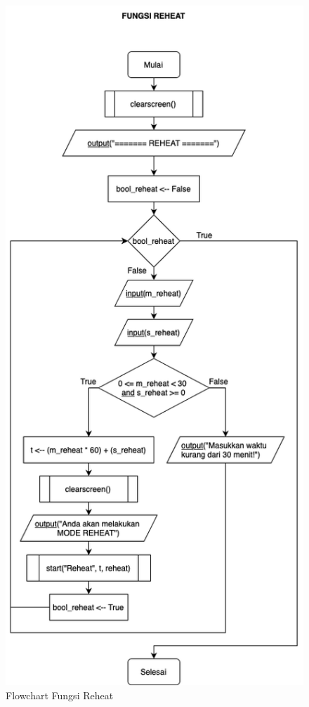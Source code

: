\documentclass[conference]{IEEEtran}
\begin{document}
\begin{figure}[htbp]
    \centering
    \def\svgwidth{\columnwidth}
    \centerline{\includegraphics[scale=0.5]{Reheat.png}}
    \caption{Flowchart Fungsi Reheat}
    \label{fig13}
\end{figure}
\end{document}
